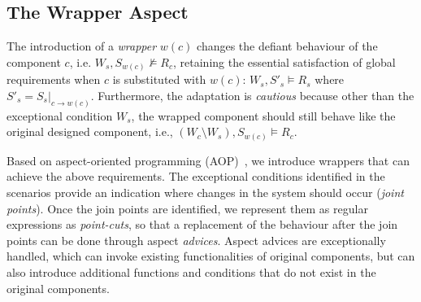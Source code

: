 





\subsection{The Wrapper Aspect}
The introduction of a {\it wrapper} $w(c)$ changes the defiant behaviour of the component $c$, i.e. $W_s, S_{w(c)} \not \models R_c$, retaining the essential satisfaction of global requirements when $c$ is substituted with $w(c)$:  $W_s, S'_s \models R_s$ where $S'_s = S_s |_{c \rightarrow w(c)}$. Furthermore, the adaptation is {\it cautious} because other than the exceptional condition $W_s$, the wrapped component should still behave like the original designed component, i.e., $(W_c \setminus W_s), S_{w(c)} \models R_c$. 

Based on aspect-oriented programming (AOP)~\cite{Kiczales:2001}, we introduce wrappers that can achieve the above requirements. The exceptional conditions identified in the scenarios provide an indication where changes in the system should occur ({\it joint points}). Once the join points are identified, we represent them as regular expressions as {\it point-cuts}, so that a replacement of the behaviour after the join points can be done through aspect {\it advices}. Aspect advices are exceptionally handled, which can invoke existing functionalities of original components, but can also introduce additional functions and conditions that do not exist in the original components.

